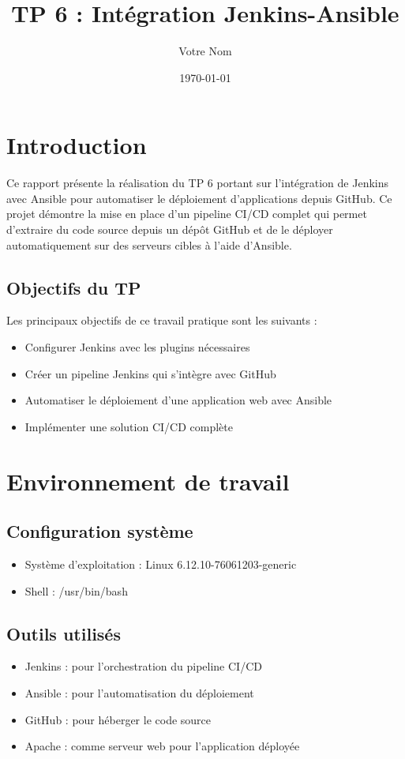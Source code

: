 \documentclass{article}
\title{\LARGE{\textbf{TP 6 : Intégration Jenkins-Ansible}}}
\author{Votre Nom}
\date{\today}
\begin{document}
\maketitle
\thispagestyle{empty}

\newpage
\tableofcontents
\thispagestyle{empty}
\newpage

\setcounter{page}{1}
\section{Introduction}
Ce rapport présente la réalisation du TP 6 portant sur l'intégration de Jenkins avec Ansible pour automatiser le déploiement d'applications depuis GitHub. Ce projet démontre la mise en place d'un pipeline CI/CD complet qui permet d'extraire du code source depuis un dépôt GitHub et de le déployer automatiquement sur des serveurs cibles à l'aide d'Ansible.

\subsection{Objectifs du TP}
Les principaux objectifs de ce travail pratique sont les suivants :
\begin{itemize}
    \item Configurer Jenkins avec les plugins nécessaires
    \item Créer un pipeline Jenkins qui s'intègre avec GitHub
    \item Automatiser le déploiement d'une application web avec Ansible
    \item Implémenter une solution CI/CD complète
\end{itemize}

\section{Environnement de travail}
\subsection{Configuration système}
\begin{itemize}
    \item Système d'exploitation : Linux 6.12.10-76061203-generic
    \item Shell : /usr/bin/bash
\end{itemize}

\subsection{Outils utilisés}
\begin{itemize}
    \item Jenkins : pour l'orchestration du pipeline CI/CD
    \item Ansible : pour l'automatisation du déploiement
    \item GitHub : pour héberger le code source
    \item Apache : comme serveur web pour l'application déployée
\end{itemize}
\end{document}
